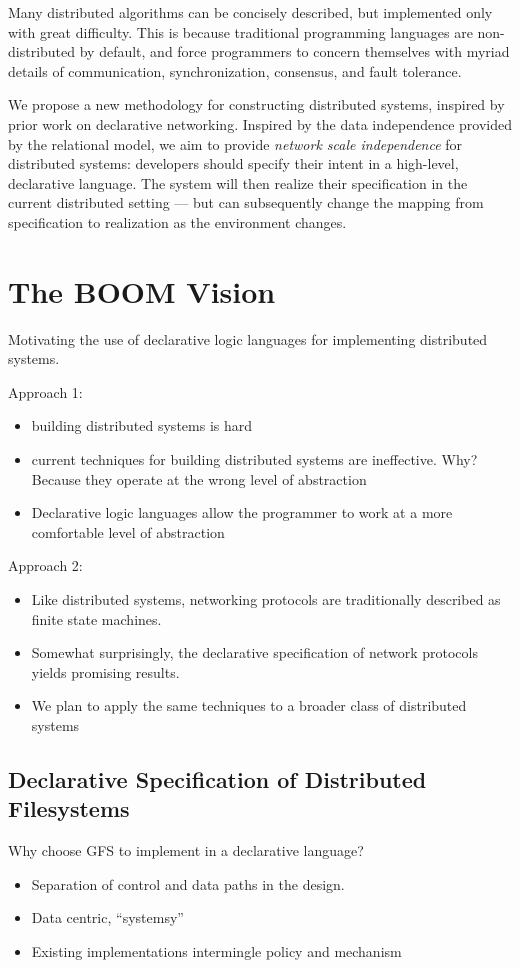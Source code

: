 \documentclass{article}
\begin{document}
Many distributed algorithms can be concisely described,
but implemented only with great difficulty. This is because
traditional programming languages are non-distributed by default, and
force programmers to concern themselves with myriad details of
communication, synchronization, consensus, and fault tolerance.

We propose a new methodology for constructing distributed systems,
inspired by prior work on declarative networking. Inspired by the data
independence provided by the relational model, we aim to provide
\emph{network scale independence} for distributed systems: developers
should specify their intent in a high-level, declarative language. The
system will then realize their specification in the current
distributed setting --- but can subsequently change the mapping from
specification to realization as the environment changes.

\section{The BOOM Vision}
Motivating the use of declarative logic languages for implementing
distributed systems.

Approach 1:
\begin{itemize}
\item
  building distributed systems is hard

\item
  current techniques for building distributed systems are
  ineffective. Why? Because they operate at the wrong level of
  abstraction

\item
  Declarative logic languages allow the programmer to work at a more
  comfortable level of abstraction
\end{itemize}

Approach 2:
\begin{itemize}
\item
  Like distributed systems, networking protocols are traditionally
  described as finite state machines.

\item 
  Somewhat surprisingly, the declarative specification of network
  protocols yields promising results.

\item 
  We plan to apply the same techniques to a broader class of
  distributed systems
\end{itemize}

\subsection{Declarative Specification of Distributed Filesystems}
Why choose GFS to implement in a declarative language?
\begin{itemize}
\item
  Separation of control and data paths in the design.

\item
  Data centric, ``systemsy''

\item
  Existing implementations intermingle policy and mechanism
\end{itemize}
\end{document}
